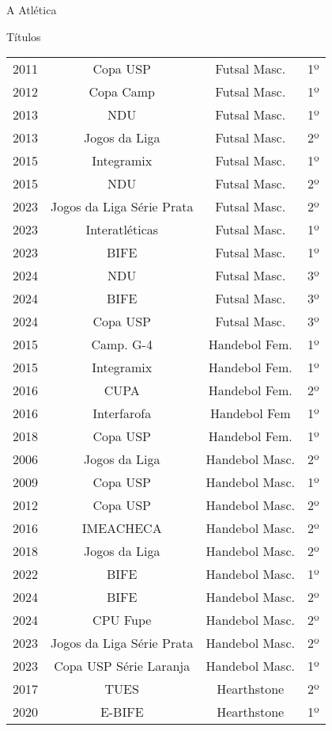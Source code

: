 \begin{secao}{A Atlética}
\begin{subsecao}{Títulos}
\begin{center}
\begin{tabular}{|c|c|c|c|}
  \hline
    2011 & Copa USP       & Futsal Masc.    & 1º\\
    2012 & Copa Camp      & Futsal Masc.    & 1º\\
    2013 & NDU            & Futsal Masc.    & 1º\\
    2013 & Jogos da Liga  & Futsal Masc.    & 2º\\
    2015 & Integramix     & Futsal Masc.    & 1º\\
    2015 & NDU            & Futsal Masc.    & 2º\\
    2023 & Jogos da Liga Série Prata & Futsal Masc. & 2º\\
    2023 & Interatléticas & Futsal Masc.    & 1º\\
    2023 & BIFE           & Futsal Masc.    & 1º\\
    2024 & NDU            & Futsal Masc.    & 3º\\
    2024 & BIFE           & Futsal Masc.    & 3º\\
    2024 & Copa USP       & Futsal Masc.    & 3º\\
    2015 & Camp. G-4      & Handebol Fem.   & 1º\\
    2015 & Integramix     & Handebol Fem.   & 1º\\
    2016 & CUPA           & Handebol Fem.   & 2º\\
    2016 & Interfarofa    & Handebol Fem    & 1º\\
    2018 & Copa USP       & Handebol Fem.   & 1º\\
    2006 & Jogos da Liga  & Handebol Masc.  & 2º\\
    2009 & Copa USP       & Handebol Masc.  & 1º\\
    2012 & Copa USP       & Handebol Masc.  & 2º\\
    2016 & IMEACHECA      & Handebol Masc.  & 2º\\
    2018 & Jogos da Liga  & Handebol Masc.  & 2º\\
    2022 & BIFE           & Handebol Masc.  & 1º\\
    2024 & BIFE           & Handebol Masc.  & 2º\\
    2024 & CPU Fupe       & Handebol Masc.  & 2º\\
    2023 & Jogos da Liga Série Prata & Handebol Masc. & 2º\\
    2023 & Copa USP Série Laranja & Handebol Masc.  & 1º\\
    2017 & TUES           & Hearthstone     & 2º\\
    2020 & E-BIFE         & Hearthstone     & 1º\\

\end{tabular}
\end{center}
\end{subsecao}
\end{secao}
